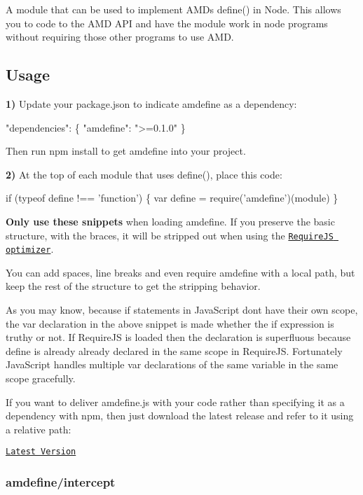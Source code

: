 A module that can be used to implement A\+MD\textquotesingle{}s define() in Node. This allows you to code to the A\+MD A\+PI and have the module work in node programs without requiring those other programs to use A\+MD.

\subsection*{Usage}

{\bfseries 1)} Update your package.\+json to indicate amdefine as a dependency\+:


\begin{DoxyCode}
"dependencies": \{
    "amdefine": ">=0.1.0"
\}
\end{DoxyCode}


Then run {\ttfamily npm install} to get amdefine into your project.

{\bfseries 2)} At the top of each module that uses define(), place this code\+:


\begin{DoxyCode}
if (typeof define !== 'function') \{ var define = require('amdefine')(module) \}
\end{DoxyCode}


{\bfseries Only use these snippets} when loading amdefine. If you preserve the basic structure, with the braces, it will be stripped out when using the \href{#optimizer}{\tt Require\+JS optimizer}.

You can add spaces, line breaks and even require amdefine with a local path, but keep the rest of the structure to get the stripping behavior.

As you may know, because {\ttfamily if} statements in Java\+Script don\textquotesingle{}t have their own scope, the var declaration in the above snippet is made whether the {\ttfamily if} expression is truthy or not. If Require\+JS is loaded then the declaration is superfluous because {\ttfamily define} is already already declared in the same scope in Require\+JS. Fortunately Java\+Script handles multiple {\ttfamily var} declarations of the same variable in the same scope gracefully.

If you want to deliver amdefine.\+js with your code rather than specifying it as a dependency with npm, then just download the latest release and refer to it using a relative path\+:

\href{https://github.com/jrburke/amdefine/raw/latest/amdefine.js}{\tt Latest Version}

\subsubsection*{amdefine/intercept}

